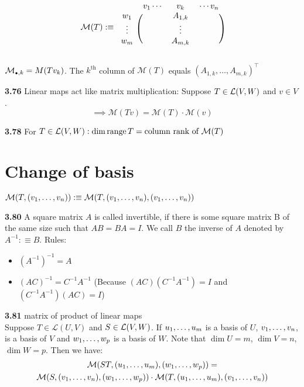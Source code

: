 \[
\mathcal{M} (T) :\equiv 
\begin{blockarray}{cccc}
	& v_1 \cdots & v_k & \cdots v_n \\
	\begin{block}{c(ccc)}
		w_1    & & A_{1,k} & \\
		\vdots & & \vdots & \\
		w_m    & & A_{m,k} & \\
	\end{block}
\end{blockarray}
\]

\setcounter{thm}{74}
$\mathcal{M}_{\mathsmaller{\bullet}, k} = M(T v_k)$. The $k^{\text{th}}$ column of $\mathcal{M}(T)$ equals $(A_{1,k}, \dots, A_{m,k})^\top$

\textbf{3.76} Linear maps act like matrix multiplication: Suppose $T\in {\mathcal{L}(V,W)}$ and $v\in V$.
\begin{equation}
	\implies \mathcal{M} (Tv)=\mathcal{M}(T) \cdot \mathcal{M}(v)
\end{equation}

\setcounter{thm}{77}
\textbf{3.78} For $T \in {\mathcal{L}(V,W)}: \dim \operatorname{range} T = \text{column rank of } \mathcal{M} (T)$

\section{Change of basis}
$\mathcal{M}(T, (v_1, \dots, v_n)) :\equiv \mathcal{M}(T, (v_1, \dots, v_n),(v_1, \dots, v_n))$

\setcounter{thm}{79}
\textbf{3.80} A square matrix $A$ is called invertible, if there is some square matrix B of the same size such that $AB=BA=I$. We call $B$ the inverse of $A$ denoted by $A^{-1} :\equiv B$. Rules: 
\begin{itemize}
	\item $(A^{-1})^{-1}=A$
	\item $(AC)^{-1} = C^{-1}A^{-1}$ (Because $(AC)(C^{-1}A^{-1})=I$ and $(C^{-1}A^{-1})(AC)=I$)
\end{itemize}

\textbf{3.81} matrix of product of linear maps \\
Suppose $T\in \mathcal{L}(U,V)$ and $S\in {\mathcal{L}(V,W)}$. If $u_1, \dots, u_m$ is a basis of $U$, $v_1, \dots, v_n$, is a basis of $V$ and $w_1, \dots, w_{p}$ is a basis of $W$. Note that $\dim U = m$, $\dim V = n$, $\dim W = p$. Then we have: 
\begin{multline}
	\mathcal{M}(ST, (u_1, \dots, u_m), (w_1, \dots, w_{p})) = \\
	\mathcal{M}(S, (v_1, \dots, v_n), (w_1, \dots, w_{p} )) \cdot
	\mathcal{M}(T, (u_1, \dots, u_m), (v_1, \dots, v_n   ))
\end{multline}

